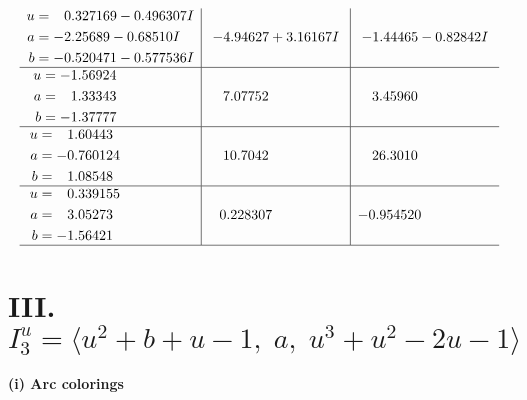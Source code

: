 \documentclass[1p]{elsarticle_modified}
\theoremstyle{definition}
\begin{document}
$$\begin{array}{c|c|c}
\begin{aligned}
u &= \phantom{-}0.327169 - 0.496307 I \\
a &= -2.25689 - 0.68510 I \\
b &= -0.520471 - 0.577536 I\end{aligned}
 & -4.94627 + 3.16167 I & -1.44465 - 0.82842 I \\ \hline\begin{aligned}
u &= -1.56924\phantom{ +0.000000I} \\
a &= \phantom{-}1.33343\phantom{ +0.000000I} \\
b &= -1.37777\phantom{ +0.000000I}\end{aligned}
 & \phantom{-}7.07752\phantom{ +0.000000I} & \phantom{-}3.45960\phantom{ +0.000000I} \\ \hline\begin{aligned}
u &= \phantom{-}1.60443\phantom{ +0.000000I} \\
a &= -0.760124\phantom{ +0.000000I} \\
b &= \phantom{-}1.08548\phantom{ +0.000000I}\end{aligned}
 & \phantom{-}10.7042\phantom{ +0.000000I} & \phantom{-}26.3010\phantom{ +0.000000I} \\ \hline\begin{aligned}
u &= \phantom{-}0.339155\phantom{ +0.000000I} \\
a &= \phantom{-}3.05273\phantom{ +0.000000I} \\
b &= -1.56421\phantom{ +0.000000I}\end{aligned}
 & \phantom{-}0.228307\phantom{ +0.000000I} & -0.954520\phantom{ +0.000000I}\\
 \hline 
 \end{array}$$\newpage\newpage\renewcommand{\arraystretch}{1}
\centering \section*{III. $I^u_{3}= \langle u^2+b+u-1,\;a,\;u^3+u^2-2 u-1 \rangle$}
\flushleft \textbf{(i) Arc colorings}\\
\end{document}
